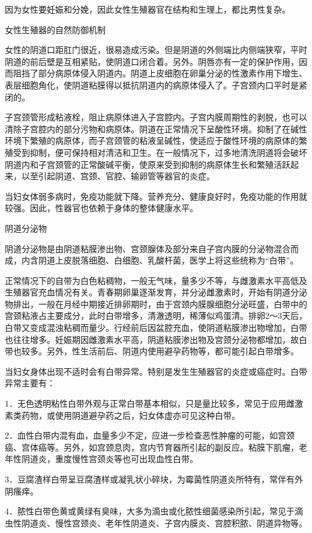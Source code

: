 \documentclass[12pt,UTF8]{ctexbook}
\begin{document}
因为女性要妊娠和分娩，因此女性生殖器官在结构和生理上，都比男性复杂。

女性生殖器的自然防御机制

女性的阴道口距肛门很近，很易造成污染。但是阴道的外侧端比内侧端狭窄，平时阴道的前后壁是互相紧贴，使阴道口闭合着。另外。阴唇亦有一定的保护作用，因而阻挡了部分病原体侵入阴道内。阴道上皮细胞在卵巢分泌的性激素作用下增生、表层细胞角化，使阴道粘膜得以抵抗阴道内的病原体侵入了。子宫颈内口平时是紧闭的。

子宫颈管形成粘液栓，阻止病原体进入子宫腔内。子宫内膜周期性的剥脱，也可以清除子宫腔内的部分污物和病原体。阴道在正常情况下呈酸性环境。抑制了在碱性环境下繁殖的病原体，而子宫颈管的粘液呈碱性，使适应于酸性环境的病原体的繁殖受到抑制，便可保持相对清洁和卫生。在一般情况下，过多地清洗阴道将会破坏阴道内和子宫颈管的正常酸碱平衡，使原来受到抑制的病原体生长和繁殖活跃起来，以至引起阴道、宫颈、官腔、输卵管等器官的炎症。

当妇女体弱多病时，免疫功能就下降。营养充分、健康良好时，免疫功能的作用就较强。因此，性器官也依赖于身体的整体健康水平。

阴道分泌物

阴道分泌物是由阴道粘膜渗出物、宫颈腺体及部分来自子宫内膜的分泌物混合而成，内含阴道上皮脱落细胞、白细胞、乳酸杆菌，医学上将这些统称为“白带”。

正常情况下的自带为白色粘稠物，一般无气味，量多少不等，与雌激素水平高低及生殖器官充血情况有关。青春期卵巢逐渐发育，并分泌雌激素时，开始有阴道分泌物排出，一般在月经中期接近排卵期时，由于宫颈内膜腺细胞分泌旺盛，白带中的宫颈粘液占主要成分，此时白带增多，清澈透明，稀薄似鸡蛋清。排卵2～3天后，白带又变成混浊粘稠而量少。行经前后因盆腔充血，使阴道粘膜渗出物增加，白带也往往增多。妊娠期因雌激素水平高，阴道粘膜渗出物及宫颈分泌物都增加，故白带也较多。另外，性生活前后、阴道内使用避孕药物等，都可能引起白带增多。

当妇女身体出现不适时会有白带异常。特别是发生生殖器官的炎症或癌症时。白带异常主要有：

1．无色透明粘性白带外观与正常白带基本相似，只是量比较多，常见于应用雌激素类药物，或使用阴道避孕药之后，妇女体虚亦可见这种白带。

2．血性白带内混有血，血量多少不定，应进一步检查恶性肿瘤的可能，如宫颈癌、宫体癌等。另外，如宫颈息肉，宫内节育器所引起的副反应。粘膜下肌瘤，老年性阴道炎，重度慢性宫颈炎等也可出现血性白带。

3．豆腐渣样白带呈豆腐渣样或凝乳状小碎块，为霉菌性阴道炎所特有，常伴有外阴瘙痒。

4．脓性白带色黄或黄绿有臭味，大多为滴虫或化脓性细菌感染所引起，常见于滴虫性阴道炎、慢性宫颈炎、老年性阴道炎、子宫内膜炎、宫腔积脓、阴道异物等。
\end{document}
